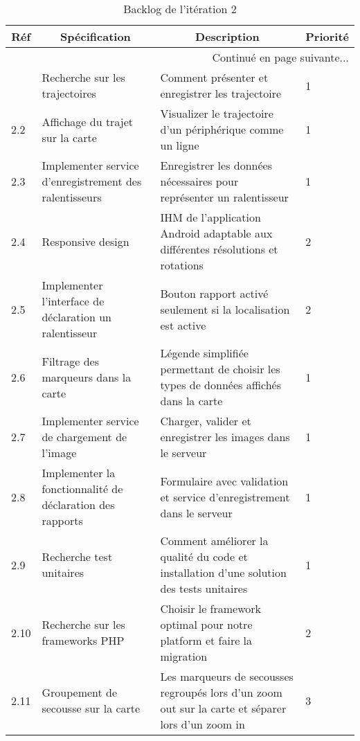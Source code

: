 \begin{center}
    \footnotesize
    \begin{longtable}{| p{1cm} | p{5cm} | p{7cm} | p{1cm} |}
        \caption{Backlog de l'itération 2}
\label{tab:sprint2-backlog} \\

        \hline
        \multicolumn{1}{|c}{\textbf{Réf}} &
        \multicolumn{1}{|c}{\textbf{Spécification}} &
        \multicolumn{1}{|c}{\textbf{Description}} &
        \multicolumn{1}{|c|}{\textbf{Priorité}} \\ \hline
        \endhead

        \hline \multicolumn{4}{|r|}{{Continué en page suivante$\dotsc$}} \\ \hline
        \endfoot

        \hline \hline
        \endlastfoot

        \hline
2.1 & Recherche sur les trajectoires & Comment présenter et enregistrer les trajectoire & 1 \\ \hline
2.2 & Affichage du trajet sur la carte & Visualizer le trajectoire d'un périphérique comme un ligne & 1 \\ \hline
2.3 & Implementer service d'enregistrement des ralentisseurs & Enregistrer les données nécessaires pour représenter un ralentisseur & 1 \\ \hline
2.4 & Responsive design & IHM de l'application Android adaptable aux différentes résolutions et rotations & 2 \\ \hline
2.5 & Implementer l'interface de déclaration un ralentisseur & Bouton rapport activé seulement si la localisation est active & 2 \\ \hline
2.6 & Filtrage des marqueurs dans la carte & Légende simplifiée permettant de choisir les types de données affichés dans la carte & 1 \\ \hline
2.7 & Implementer service de chargement de l'image & Charger, valider et enregistrer les images dans le serveur & 1 \\ \hline
2.8 & Implementer la fonctionnalité de déclaration des rapports & Formulaire avec validation et service d'enregistrement dans le serveur & 1 \\ \hline
2.9 & Recherche test unitaires & Comment améliorer la qualité du code et installation d'une solution des tests unitaires & 1 \\ \hline
2.10 & Recherche sur les frameworks PHP & Choisir le framework optimal pour notre platform et faire la migration & 2 \\ \hline
2.11 & Groupement de secousse sur la carte & Les marqueurs de secousses regroupés lors d'un zoom out sur la carte et séparer lors d'un zoom in & 3 \\ \hline
    \end{longtable}
\end{center}

